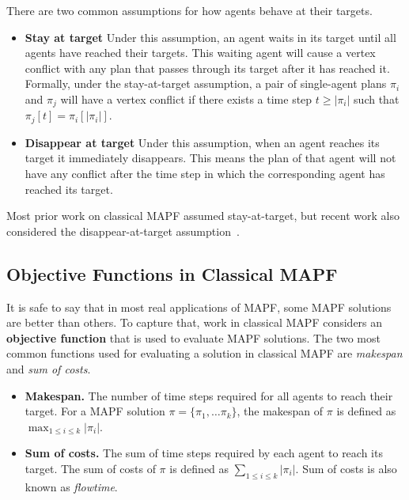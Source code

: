 \documentclass[letterpaper]{article} %
\newcommand{\comment}[1]{{\nb{\textbf{Comment:}}{orange}{#1}}}
\begin{document}
There are two common assumptions for how agents behave at their targets.
\begin{itemize}
\item \textbf{Stay at target} Under this assumption,
an agent waits in its target until all agents have reached their targets.
This waiting agent will cause a vertex conflict with any plan that passes through
its target after it has reached it.
Formally, under the stay-at-target assumption,
a pair of single-agent plans $\pi_i$ and $\pi_j$ will have a vertex conflict
if there exists a time step $t\geq |\pi_i|$ such that $\pi_j[t]=\pi_i[|\pi_i|]$.
\item \textbf{Disappear at target} Under this assumption,
when an agent reaches its target it immediately disappears.
This means the plan of that agent will not have any conflict after
the time step in which the corresponding agent has reached its target.
\end{itemize}
Most prior work on classical MAPF assumed stay-at-target, but recent work also considered the disappear-at-target assumption~\cite{MaAAAI19a}.

\subsection{Objective Functions in Classical MAPF}
It is safe to say that in most real applications of MAPF,
some MAPF solutions are better than others.
To capture that, work in classical MAPF considers an \textbf{objective function}
that is used to evaluate MAPF solutions.
The two most common functions used for evaluating a solution in classical MAPF are \emph{makespan} and \emph{sum of costs}.
\begin{itemize}
\item \textbf{Makespan.} The number of time steps required for all agents to reach their target.
For a MAPF solution $\pi=\{\pi_1, \ldots \pi_k\}$, the makespan of $\pi$ is defined as $\max_{1\leq i\leq k} |\pi_i|$.
\item \textbf{Sum of costs.} The sum of time steps required by each agent to reach its target. The sum of costs of $\pi$ is defined as $\sum_{1\leq i\leq k} |\pi_i|$.
Sum of costs is also known as \emph{flowtime}.
\end{itemize}
\end{document}
